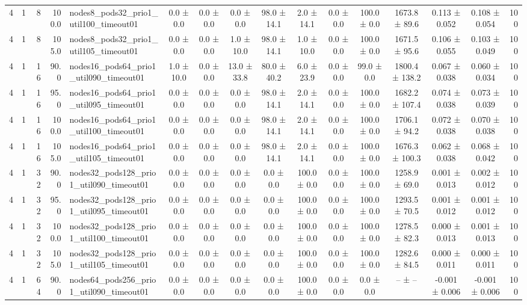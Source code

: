 \begin{tabular}{r r r r l c c c c c c c c c c r}
4 & 1 & 8 & 100.0 & nodes8\_pods32\_prio1\_util100\_timeout01 & 0.0 ± 0.0 & 0.0 ± 0.0 & 0.0 ± 0.0 & 98.0 ± 14.1 & 2.0 ± 14.1 & 0.0 ± 0.0 & 100.0 ± 0.0 & 1673.8 ± 89.6 & 0.113 ± 0.052 & 0.108 ± 0.054 & 100 \\
4 & 1 & 8 & 105.0 & nodes8\_pods32\_prio1\_util105\_timeout01 & 0.0 ± 0.0 & 0.0 ± 0.0 & 1.0 ± 10.0 & 98.0 ± 14.1 & 1.0 ± 10.0 & 0.0 ± 0.0 & 100.0 ± 0.0 & 1671.5 ± 95.6 & 0.106 ± 0.055 & 0.103 ± 0.049 & 100 \\
4 & 1 & 16 & 90.0 & nodes16\_pods64\_prio1\_util090\_timeout01 & 1.0 ± 10.0 & 0.0 ± 0.0 & 13.0 ± 33.8 & 80.0 ± 40.2 & 6.0 ± 23.9 & 0.0 ± 0.0 & 99.0 ± 0.0 & 1800.4 ± 138.2 & 0.067 ± 0.038 & 0.060 ± 0.034 & 100 \\
4 & 1 & 16 & 95.0 & nodes16\_pods64\_prio1\_util095\_timeout01 & 0.0 ± 0.0 & 0.0 ± 0.0 & 0.0 ± 0.0 & 98.0 ± 14.1 & 2.0 ± 14.1 & 0.0 ± 0.0 & 100.0 ± 0.0 & 1682.2 ± 107.4 & 0.074 ± 0.038 & 0.073 ± 0.039 & 100 \\
4 & 1 & 16 & 100.0 & nodes16\_pods64\_prio1\_util100\_timeout01 & 0.0 ± 0.0 & 0.0 ± 0.0 & 0.0 ± 0.0 & 98.0 ± 14.1 & 2.0 ± 14.1 & 0.0 ± 0.0 & 100.0 ± 0.0 & 1706.1 ± 94.2 & 0.072 ± 0.038 & 0.070 ± 0.038 & 100 \\
4 & 1 & 16 & 105.0 & nodes16\_pods64\_prio1\_util105\_timeout01 & 0.0 ± 0.0 & 0.0 ± 0.0 & 0.0 ± 0.0 & 98.0 ± 14.1 & 2.0 ± 14.1 & 0.0 ± 0.0 & 100.0 ± 0.0 & 1676.3 ± 100.3 & 0.062 ± 0.038 & 0.068 ± 0.042 & 100 \\
4 & 1 & 32 & 90.0 & nodes32\_pods128\_prio1\_util090\_timeout01 & 0.0 ± 0.0 & 0.0 ± 0.0 & 0.0 ± 0.0 & 0.0 ± 0.0 & 100.0 ± 0.0 & 0.0 ± 0.0 & 100.0 ± 0.0 & 1258.9 ± 69.0 & 0.001 ± 0.013 & 0.002 ± 0.012 & 100 \\
4 & 1 & 32 & 95.0 & nodes32\_pods128\_prio1\_util095\_timeout01 & 0.0 ± 0.0 & 0.0 ± 0.0 & 0.0 ± 0.0 & 0.0 ± 0.0 & 100.0 ± 0.0 & 0.0 ± 0.0 & 100.0 ± 0.0 & 1293.5 ± 70.5 & 0.001 ± 0.012 & 0.001 ± 0.012 & 100 \\
4 & 1 & 32 & 100.0 & nodes32\_pods128\_prio1\_util100\_timeout01 & 0.0 ± 0.0 & 0.0 ± 0.0 & 0.0 ± 0.0 & 0.0 ± 0.0 & 100.0 ± 0.0 & 0.0 ± 0.0 & 100.0 ± 0.0 & 1278.5 ± 82.3 & 0.000 ± 0.013 & 0.001 ± 0.013 & 100 \\
4 & 1 & 32 & 105.0 & nodes32\_pods128\_prio1\_util105\_timeout01 & 0.0 ± 0.0 & 0.0 ± 0.0 & 0.0 ± 0.0 & 0.0 ± 0.0 & 100.0 ± 0.0 & 0.0 ± 0.0 & 100.0 ± 0.0 & 1282.6 ± 84.5 & 0.000 ± 0.011 & 0.000 ± 0.011 & 100 \\
4 & 1 & 64 & 90.0 & nodes64\_pods256\_prio1\_util090\_timeout01 & 0.0 ± 0.0 & 0.0 ± 0.0 & 0.0 ± 0.0 & 0.0 ± 0.0 & 100.0 ± 0.0 & 0.0 ± 0.0 & 0.0 ± 0.0 & -- ± -- & -0.001 ± 0.006 & -0.001 ± 0.006 & 100 \\

\end{tabular}

